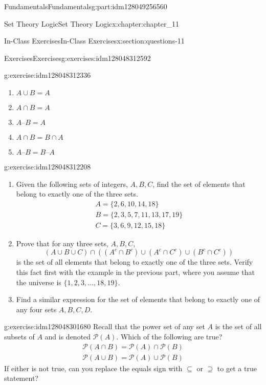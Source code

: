 \documentclass[oneside,10pt,]{book}
\numberwithin{equation}{section}
\begin{document}
\begin{partptx}{Fundamentals}{}{Fundamentals}{}{}{g:part:idm128049256560}
\begin{chapterptx}{Set Theory Logic}{}{Set Theory Logic}{}{}{x:chapter:chapter_11}
\begin{sectionptx}{In-Class Exercises}{}{In-Class Exercises}{}{}{x:section:questions-11}
\begin{exercises-subsection}{Exercises}{}{Exercises}{}{}{g:exercises:idm128048312592}
\begin{exercisegroup}
\begin{divisionexerciseeg}{1}{}{}{g:exercise:idm128048312336}
\begin{enumerate}[label=(\alph*)]
\item{}\(\displaystyle A \cup B = A\)%
\item{}\(\displaystyle A\cap B = A\)%
\item{}\(\displaystyle A–B = A\)%
\item{}\(\displaystyle A\cap B = B\cap A\)%
\item{}\(\displaystyle A–B = B–A\)%
\end{enumerate}
%
\end{divisionexerciseeg}%
\begin{divisionexerciseeg}{2}{}{}{g:exercise:idm128048312208}%
%
\begin{enumerate}[label=(\alph*)]
\item{}Given the following sets of integers, \(A, B, C\), find the set of elements that belong to exactly one of the three sets.%
\begin{gather*}
A=\{2,6,10,14,18\}\\
B=\{2,3,5,7,11,13,17,19\}\\
C=\{3,6,9,12,15,18\}
\end{gather*}
%
\item{}Prove that for any three sets, \(A, B, C\),%
\begin{equation*}
(A \cup B \cup C)\cap ((A^c \cap B^c)\cup (A^c \cap C^c)\cup (B^c \cap C^c))
\end{equation*}
is the set of all elements that belong to exactly one of the three sets.  Verify this fact first with the example in the previous part, where you assume that the universe is \(\{1,2,3,\dots,18,19\}\).%
\item{}Find a similar expression for the set of elements that belong to exactly one of any four sets \(A, B, C, D.\)%
\end{enumerate}
%
\end{divisionexerciseeg}%
\begin{divisionexerciseeg}{3}{}{}{g:exercise:idm128048301680}%
Recall that the power set of any set \(A\) is the set of all subsets of \(A\) and is denoted \(\mathcal{P}(A)\).  Which of the following are true?%
\begin{gather*}
\mathcal{P}(A \cap B) = \mathcal{P}(A) \cap \mathcal{P}(B)\\
\mathcal{P}(A \cup B) = \mathcal{P}(A) \cup \mathcal{P}(B)
\end{gather*}
If either is not true, can you replace the equals sign with \(\subseteq\) or \(\supseteq\) to get a true statement?%

\end{divisionexerciseeg}
\end{exercisegroup}
\end{exercises-subsection}
\end{sectionptx}
\end{chapterptx}
\end{partptx}
\end{document}
